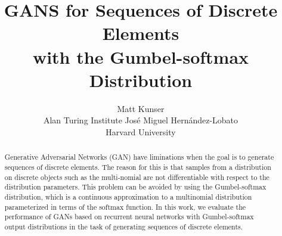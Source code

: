 \documentclass{article}
\title{GANS for Sequences of Discrete Elements \\with the Gumbel-softmax Distribution}
\author{
    Matt Kunser\\
    Alan Turing Institute
    \And
    Jos\'e Miguel Hern\'andez-Lobato\\
    Harvard University
}
\begin{document}

\maketitle

\begin{abstract}
Generative Adversarial Networks (GAN) have liminations when the goal is to
generate sequences of discrete elements. The reason for this is that
samples from a distribution on discrete objects such as the multi-nomial are
not differentiable with respect to the distribution parameters. This problem
can be avoided by using the Gumbel-softmax distribution, which is a continuous
approximation to a multinomial distribution parameterized in terms of the
softmax function. In this work, we evaluate the performance of GANs based on
recurrent neural networks with Gumbel-softmax output distributions in the task
of generating sequences of discrete elements.
\end{abstract}







\end{document}
